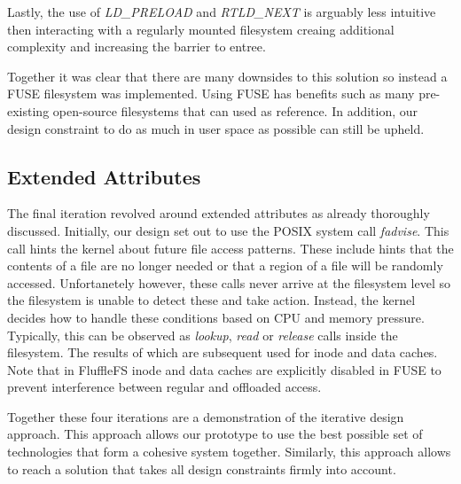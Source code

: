 Lastly, the use of \textit{LD\_PRELOAD} and \textit{RTLD\_NEXT} is arguably
less intuitive then interacting with a regularly mounted filesystem creaing
additional complexity and increasing the barrier to entree.

Together it was clear that there are many downsides to this solution so instead
a FUSE filesystem was implemented. Using FUSE has benefits such as many
pre-existing open-source filesystems that can used as reference. In addition,
our design constraint to do as much in user space as possible can still be
upheld.

\subsection{Extended Attributes}

The final iteration revolved around extended attributes as already thoroughly
discussed. Initially, our design set out to use the POSIX system call
\textit{fadvise}. This call hints the kernel about future file access
patterns. These include hints that the contents of a file are no longer
needed or that a region of a file will be randomly accessed. Unfortanetely
however, these calls never arrive at the filesystem level so the filesystem is
unable to detect these and take action. Instead, the kernel decides how to
handle these conditions based on CPU and memory pressure. Typically, this
can be observed as \textit{lookup}, \textit{read} or \textit{release} calls
inside the filesystem. The results of which are subsequent used for inode and
data caches. Note that in FluffleFS inode and data caches are explicitly
disabled in FUSE to prevent interference between regular and offloaded access.

Together these four iterations are a demonstration of the iterative design
approach. This approach allows our prototype to use the best possible set
of technologies that form a cohesive system together. Similarly, this approach
allows to reach a solution that takes all design constraints firmly into
account.

